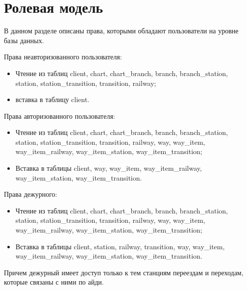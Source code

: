 \section{Ролевая модель}
В данном разделе описаны права, которыми обладают пользователи на уровне базы данных.

Права неавторизованного пользователя:
\begin{itemize}
	\item[---] Чтение из таблиц client, chart, chart\_branch, branch, branch\_station, station, station\_transition, transition, railway;
	\item[---] вставка в таблицу client.
\end{itemize}

Права авторизованного пользователя:
\begin{itemize}
	\item[---] Чтение из таблиц client, chart, chart\_branch, branch, branch\_station, station, station\_transition, transition, railway, way, way\_item, way\_item\_railway, way\_item\_station, way\_item\_transition;
	\item[---] Вставка в таблицы client, way, way\_item, way\_item\_railway, way\_item\_station, way\_item\_transition.
\end{itemize}

Права дежурного:
\begin{itemize}
	\item[---] Чтение из таблиц client, chart, chart\_branch, branch, branch\_station, station, station\_transition, transition, railway, way, way\_item, way\_item\_railway, way\_item\_station, way\_item\_transition;
	\item[---] Вставка в таблицы client, station, railway, transition, way, way\_item, way\_item\_railway, way\_item\_station, way\_item\_transition.
\end{itemize}

Причем дежурный имеет доступ только к тем станциям переездам и переходам, которые связаны с ними по айди.
